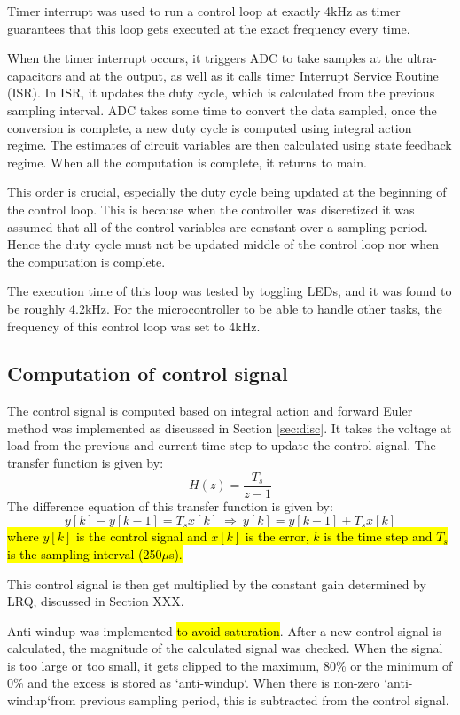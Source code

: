 Timer interrupt was used to run a control loop at exactly 4kHz as timer guarantees that this loop gets executed at the exact frequency every time. 

When the timer interrupt occurs, it triggers ADC to take samples at the ultra-capacitors and at the output, as well as it calls timer Interrupt Service Routine (ISR). In ISR, it updates the duty cycle, which is calculated from the previous sampling interval. ADC takes some time to convert the data sampled, once the conversion is complete, a new duty cycle is computed using integral action regime. The estimates of circuit variables are then calculated using state feedback regime. When all the computation is complete, it returns to main. 

This order is crucial, especially the duty cycle being updated at the beginning of the control loop. This is because when the controller was discretized it was assumed that all of the control variables are constant over a sampling period. Hence the duty cycle must not be updated middle of the control loop nor when the computation is complete.

The execution time of this loop was tested by toggling LEDs, and it was found to be roughly 4.2kHz. For the microcontroller to be able to handle other tasks, the frequency of this control loop was set to 4kHz.

\subsection{Computation of control signal}
The control signal is computed based on integral action and forward Euler method was implemented as discussed in Section \ref{sec:disc}. It takes the voltage at load from the previous and current time-step to update the control signal. The transfer function is given by:
\[
    H(z) = \frac{T_s}{z-1}
\]
The difference equation of this transfer function is given by:
\[
    y[k] - y[k-1] = T_s x[k] \: \Longrightarrow \: y[k] = y[k-1] + T_s x[k]
\]
\hl{where $y[k]$ is the control signal and $x[k]$ is the error, $k$ is the time step and $T_s$ is the sampling interval (250$\mu$s).}

This control signal is then get multiplied by the constant gain determined by LRQ, discussed in Section XXX.

Anti-windup was implemented \hl{to avoid saturation}. After a new control signal is calculated, the magnitude of the calculated signal was checked. When the signal is too large or too small, it gets clipped to the maximum, 80\% or the minimum of 0\% and the excess is stored as \lq anti-windup\lq. When there is non-zero \lq anti-windup\lq from previous sampling period, this is subtracted from the control signal. 

